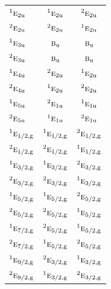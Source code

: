 \documentclass[10pt,a4paper]{article}
\numberwithin{equation}{section}
\newcommand{\irr}[1]{\text{\normalfont\scshape #1}}
\newcommand{\conjpair}[1]{{}^{#1}}
\newcommand{\ptag}[1]{\mathrm{#1}}
\begin{document}
{\begin{longtable}{@{}lcc@{}}
$\conjpair{1}\irr{e}_{2\ptag{u}}$ & $\conjpair{1}\irr{e}_{2\ptag{u}}$ & $\conjpair{2}\irr{e}_{2\ptag{u}}$\\
$\conjpair{2}\irr{e}_{2\ptag{u}}$ & $\conjpair{2}\irr{e}_{2\ptag{u}}$ & $\conjpair{1}\irr{e}_{2\ptag{u}}$\\
$\conjpair{1}\irr{e}_{3\ptag{u}}$ & $\irr{b}_{\ptag{u}}$ & $\irr{b}_{\ptag{u}}$\\
$\conjpair{2}\irr{e}_{3\ptag{u}}$ & $\irr{b}_{\ptag{u}}$ & $\irr{b}_{\ptag{u}}$\\
$\conjpair{1}\irr{e}_{4\ptag{u}}$ & $\conjpair{2}\irr{e}_{2\ptag{u}}$ & $\conjpair{1}\irr{e}_{2\ptag{u}}$\\
$\conjpair{2}\irr{e}_{4\ptag{u}}$ & $\conjpair{1}\irr{e}_{2\ptag{u}}$ & $\conjpair{2}\irr{e}_{2\ptag{u}}$\\
$\conjpair{1}\irr{e}_{5\ptag{u}}$ & $\conjpair{2}\irr{e}_{1\ptag{u}}$ & $\conjpair{1}\irr{e}_{1\ptag{u}}$\\
$\conjpair{2}\irr{e}_{5\ptag{u}}$ & $\conjpair{1}\irr{e}_{1\ptag{u}}$ & $\conjpair{2}\irr{e}_{1\ptag{u}}$\\
$\conjpair{1}\irr{e}_{1/2,\ptag{g}}$ & $\conjpair{1}\irr{e}_{1/2,\ptag{g}}$ & $\conjpair{2}\irr{e}_{1/2,\ptag{g}}$\\
$\conjpair{2}\irr{e}_{1/2,\ptag{g}}$ & $\conjpair{2}\irr{e}_{1/2,\ptag{g}}$ & $\conjpair{1}\irr{e}_{1/2,\ptag{g}}$\\
$\conjpair{1}\irr{e}_{3/2,\ptag{g}}$ & $\conjpair{1}\irr{e}_{3/2,\ptag{g}}$ & $\conjpair{2}\irr{e}_{3/2,\ptag{g}}$\\
$\conjpair{2}\irr{e}_{3/2,\ptag{g}}$ & $\conjpair{2}\irr{e}_{3/2,\ptag{g}}$ & $\conjpair{1}\irr{e}_{3/2,\ptag{g}}$\\
$\conjpair{1}\irr{e}_{5/2,\ptag{g}}$ & $\conjpair{1}\irr{e}_{5/2,\ptag{g}}$ & $\conjpair{2}\irr{e}_{5/2,\ptag{g}}$\\
$\conjpair{2}\irr{e}_{5/2,\ptag{g}}$ & $\conjpair{2}\irr{e}_{5/2,\ptag{g}}$ & $\conjpair{1}\irr{e}_{5/2,\ptag{g}}$\\
$\conjpair{1}\irr{e}_{7/2,\ptag{g}}$ & $\conjpair{2}\irr{e}_{5/2,\ptag{g}}$ & $\conjpair{1}\irr{e}_{5/2,\ptag{g}}$\\
$\conjpair{2}\irr{e}_{7/2,\ptag{g}}$ & $\conjpair{1}\irr{e}_{5/2,\ptag{g}}$ & $\conjpair{2}\irr{e}_{5/2,\ptag{g}}$\\
$\conjpair{1}\irr{e}_{9/2,\ptag{g}}$ & $\conjpair{2}\irr{e}_{3/2,\ptag{g}}$ & $\conjpair{1}\irr{e}_{3/2,\ptag{g}}$\\
$\conjpair{2}\irr{e}_{9/2,\ptag{g}}$ & $\conjpair{1}\irr{e}_{3/2,\ptag{g}}$ & $\conjpair{2}\irr{e}_{3/2,\ptag{g}}$\\

\end{longtable}}
\end{document}
